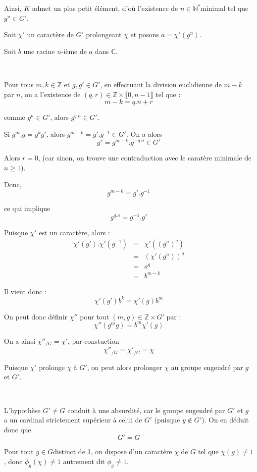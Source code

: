 Ainsi, $K$ admet un plus petit {\'e}l{\'e}ment, d'o{\`u} l'existence de $n \in
\mathbb{N}^{\ast} $minimal tel que $y^n \in G'$.

Soit $\chi'$ un caract{\`e}re de $G'$ prolongeant $\chi$ et posons $a = \chi'
(g^n)$.

Soit $b$ une racine $n$-i{\`e}me de $a$ dans $\mathbb{C}$.

\

Pour tous $m, k \in \mathbb{Z}$ et $g, g' \in G'$, en effectuant la division
euclidienne de $m - k$ par $n$, on a l'existence de $(q, r) \in \mathbb{Z}
\times \llbracket 0, n - 1 \rrbracket$ tel que :
\[ m - k = q.n + r \]


comme $g^n \in G'$, alors $g^{q.n} \in G'$.

Si $g^m .g = y^k g'$, alors $g^{m - k} = g' .g^{- 1} \in G'$. On a alors
\[ g^r = g^{m - k} .g^{- q.n} \in G' \]


Alors $r = 0$, (car sinon, on trouve une contraduction avec le carat{\`e}re
minimale de $n \geqslant 1$).

Donc,
\[ g^{m - k} = g' .g^{- 1} \]


ce qui implique
\[ g^{q.n} = g^{- 1} .g' \]


Puisque $\chi'$ est un caract{\`e}re, alors :
\begin{eqnarray*}
  \chi' (g') . \chi' (g^{- 1}) & = & \chi' ((g^n)^q)\\
  & = & (\chi' (g^n) )^q\\
  & = & a^q\\
  & = & b^{m - k}
\end{eqnarray*}


Il vient donc :
\[ \chi' (g') b^k = \chi' (g ) b^m \]


On peut donc d{\'e}finir $\chi''$ pour tout $(m, g) \in \mathbb{Z} \times G'$
par :
\[ \chi'' (g^m g) = b^m \chi' (g) \]


On a ainsi $\chi''_{/ G} = \chi'$, par constuction
\[ \chi''_{/ G} = \chi'_{/ G} = \chi \]


Puisque $\chi'$ prolonge $\chi$ {\`a} $G'$, on peut alors prolonger $\chi$ au
groupe engendr{\'e} par $g$ et $G'$.

\

L'hypoth{\`e}se $G' \neq G$ conduit {\`a} une absurdit{\'e}, car le groupe
engendr{\'e} par $G'$ et $g$ a un cardinal strictement sup{\'e}rieur {\`a}
celui de $G'$ (puisque $y \nin G'$). On en d{\'e}duit donc que
\[ G' = G \]


Pour tout $g \in G$distinct de 1, on dispose d'un caract{\`e}re $\chi$ de $G$
tel que $\chi (g) \neq 1$, donc $\phi_g (\chi) \neq 1$ autrement dit $\phi_g
\neq 1$.

